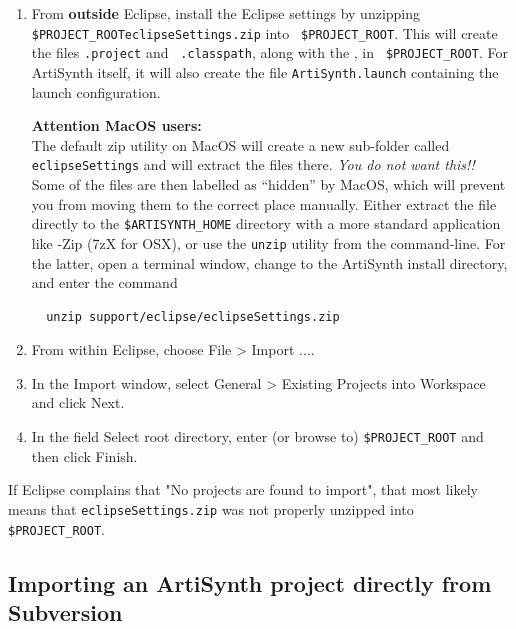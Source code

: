 \begin{enumerate}

\item From {\bf outside} Eclipse, install the Eclipse settings by
unzipping {\tt \$PROJECT\_ROOT\SEP eclipse\-Settings.zip} into {\tt
\$PROJECT\_ROOT}. This will create the files {\tt .project} and {\tt
.classpath}, along with the , in {\tt
\$PROJECT\_ROOT}.  For ArtiSynth itself, it will also create the file
{\tt ArtiSynth.launch} containing the launch configuration.

\ifMacOS
\begin{sideblock}
{\bf Attention MacOS users:}\\[0.5em]
The default zip utility on MacOS will create a new sub-folder called 
{\tt eclipseSettings} and will extract the files there.  
\emph{You do not want this!!}
Some of the files are then labelled as ``hidden'' by MacOS, which will
prevent you from moving them to the correct place manually. 
Either extract the file directly to the {\tt\$ARTISYNTH\_HOME} directory 
with a more standard application like {-Zip} ({\sf 7zX} for OSX), 
or use the {\tt unzip} utility from the command-line.  For the latter,
open a terminal window, change to the ArtiSynth install directory,
and enter the command
\begin{verbatim}
  unzip support/eclipse/eclipseSettings.zip
\end{verbatim}
\end{sideblock}
\fi

\item From within Eclipse, choose {\sf File > Import ...}.

\item In the {\sf Import} window, select {\sf General > Existing Projects into
Workspace} and click {\sf Next}.

\item In the field {\sf Select root directory}, enter (or browse to) 
{\tt \$PROJECT\_ROOT} and then click {\sf Finish}. 

\end{enumerate}

If Eclipse complains that {\sf "No projects are found to import"}, that most
likely means that {\tt eclipseSettings.zip} was not
properly unzipped into {\tt \$PROJECT\_ROOT}.

\subsection{Importing an ArtiSynth project directly from Subversion}
\label{importingFromSubversion}

